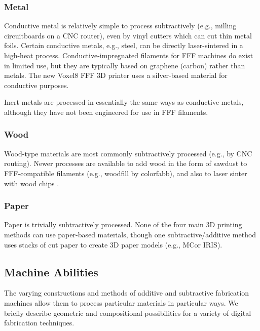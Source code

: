 \subsubsection{Metal}

Conductive metal is relatively simple to process subtractively (e.g., milling circuitboards on a CNC router), even by vinyl cutters which can cut thin metal foils. Certain conductive metals, e.g., steel, can be directly laser-sintered in a high-heat process. Conductive-impregnated filaments for FFF machines do exist in limited use, but they are typically based on graphene (carbon) rather than metals. The new Voxel8 FFF 3D printer \cite{voxel8} uses a silver-based material for conductive purposes.

Inert metals are processed in essentially the same ways as conductive metals, although they have not been engineered for use in FFF filaments.

\subsubsection{Wood}

Wood-type materials are most commonly subtractively processed (e.g., by CNC routing). Newer processes are available to add wood in the form of sawdust to FFF-compatible filaments (e.g., woodfill by colorfabb), and also to laser sinter with wood chips \cite{materialise-wood}.

\subsubsection{Paper}

Paper is trivially subtractively processed. None of the four main 3D printing methods can use paper-based materials, though one subtractive/additive method uses stacks of cut paper to create 3D paper models (e.g., MCor IRIS).

\subsection{Machine Abilities}

The varying constructions and methods of additive and subtractive fabrication machines allow them to process particular materials in particular ways. We briefly describe geometric and compositional possibilities for a variety of digital fabrication techniques.

